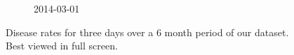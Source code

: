 \begin{figure}
\begin{subfigure}[b]{0.6\textwidth}
        \caption*{2014-03-01}
    \end{subfigure}
    \caption{Disease rates for three days over a 6 month period of our dataset. Best viewed in full screen.}\label{fig:usa}
\end{figure}







%



